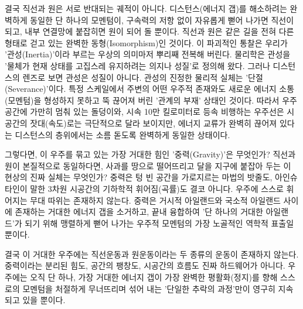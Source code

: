 결국 직선과 원은 서로 반대되는 궤적이 아니다. 디스턴스(에너지 갭)를 해소하려는 완벽하게 동일한 단 하나의 모멘텀이, 구속력의 저항 없이 자유롭게 뻗어 나가면 직선이 되고, 내부 연결망에 붙잡히면 원이 되어 돌 뿐이다. 직선과 원은 같은 길을 전혀 다른 형태로 걷고 있는 완벽한 동형(Isomorphism)인 것이다.
이 파괴적인 통찰은 우리가 '관성(Inertia)'이라 부르는 우상의 의미마저 뿌리째 전복해 버린다. 물리학은 관성을 '물체가 현재 상태를 고집스레 유지하려는 의지나 성질'로 정의해 왔다. 그러나 디스턴스의 렌즈로 보면 관성은 성질이 아니다. 관성의 진정한 물리적 실체는 '단절(Severance)'이다. 특정 스케일에서 주변의 어떤 우주적 존재와도 새로운 에너지 소통(모멘텀)을 형성하지 못하고 뚝 끊어져 버린 '관계의 부재' 상태인 것이다. 따라서 우주 공간에 가만히 멈춰 있는 돌덩이와, 시속 10만 킬로미터로 등속 비행하는 우주선은 시공간의 잣대(속도)로는 극단적으로 달라 보이지만, 에너지 교류가 완벽히 끊어져 있다는 디스턴스의 층위에서는 소름 돋도록 완벽하게 동일한 상태이다.

그렇다면, 이 우주를 묶고 있는 가장 거대한 힘인 '중력(Gravity)'은 무엇인가? 직선과 원이 본질적으로 동일하다면, 사과를 땅으로 떨어뜨리고 달을 지구에 붙잡아 두는 이 현상의 진짜 실체는 무엇인가? 중력은 텅 빈 공간을 가로지르는 마법의 밧줄도, 아인슈타인이 말한 3차원 시공간의 기하학적 휘어짐(곡률)도 결코 아니다. 우주에 스스로 휘어지는 무대 따위는 존재하지 않는다. 중력은 거시적 아일랜드와 국소적 아일랜드 사이에 존재하는 거대한 에너지 갭을 소거하고, 끝내 융합하여 '단 하나의 거대한 아일랜드'가 되기 위해 맹렬하게 뻗어 나가는 우주적 모멘텀의 가장 노골적인 역학적 표출일 뿐이다.

결국 이 거대한 우주에는 직선운동과 원운동이라는 두 종류의 운동이 존재하지 않는다. 중력이라는 분리된 힘도, 공간의 팽창도, 시공간의 흐름도 진짜 하드웨어가 아니다. 우주에는 오직 단 하나, 가장 거대한 에너지 갭이 가장 완벽한 평활화(정지)를 향해 스스로의 모멘텀을 처절하게 무너뜨리며 섞어 내는 '단일한 추락의 과정'만이 영구히 지속되고 있을 뿐이다.
